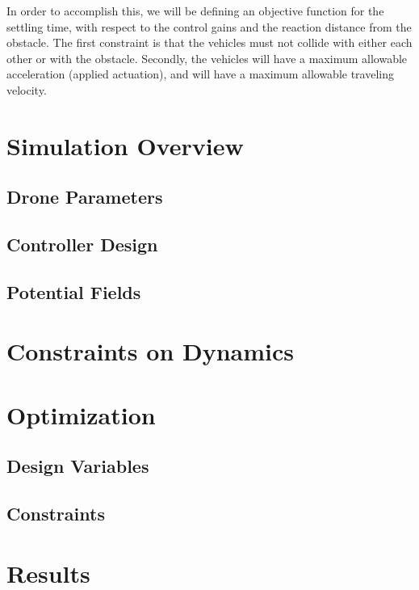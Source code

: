 \documentclass[11pt]{article}
\begin{document}
In order to accomplish this, we will be defining an objective function for the settling time, with respect to the control gains and the reaction distance from the obstacle.  The first constraint is that the vehicles must not collide with either each other or with the obstacle.  Secondly, the vehicles will have a maximum allowable acceleration (applied actuation), and will have a maximum allowable traveling velocity.


\section{Simulation Overview}
\subsection{Drone Parameters}

\subsection{Controller Design}

\subsection{Potential Fields}

\section{Constraints on Dynamics}

\section{Optimization}

\subsection{Design Variables}

\subsection{Constraints}

\section{Results}
\end{document}
